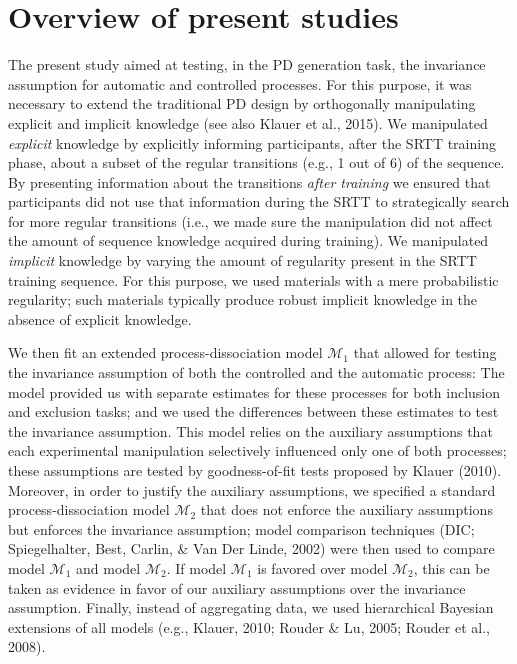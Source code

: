 \documentclass[floatsintext,man]{apa6}
\begin{document}
\section{Overview of present studies}\label{overview-of-present-studies}

The present study aimed at testing, in the PD generation task, the
invariance assumption for automatic and controlled processes. For this
purpose, it was necessary to extend the traditional PD design by
orthogonally manipulating explicit and implicit knowledge (see also
Klauer et al., 2015). We manipulated \emph{explicit} knowledge by
explicitly informing participants, after the SRTT training phase, about
a subset of the regular transitions (e.g., 1 out of 6) of the sequence.
By presenting information about the transitions \emph{after training} we
ensured that participants did not use that information during the SRTT
to strategically search for more regular transitions (i.e., we made sure
the manipulation did not affect the amount of sequence knowledge
acquired during training). We manipulated \emph{implicit} knowledge by
varying the amount of regularity present in the SRTT training sequence.
For this purpose, we used materials with a mere probabilistic
regularity; such materials typically produce robust implicit knowledge
in the absence of explicit knowledge.

We then fit an extended process-dissociation model \(\mathcal{M}_1\)
that allowed for testing the invariance assumption of both the
controlled and the automatic process: The model provided us with
separate estimates for these processes for both inclusion and exclusion
tasks; and we used the differences between these estimates to test the
invariance assumption. This model relies on the auxiliary assumptions
that each experimental manipulation selectively influenced only one of
both processes; these assumptions are tested by goodness-of-fit tests
proposed by Klauer (2010). Moreover, in order to justify the auxiliary
assumptions, we specified a standard process-dissociation model
\(\mathcal{M}_2\) that does not enforce the auxiliary assumptions but
enforces the invariance assumption; model comparison techniques (DIC;
Spiegelhalter, Best, Carlin, \& Van Der Linde, 2002) were then used to
compare model \(\mathcal{M}_1\) and model \(\mathcal{M}_2\). If model
\(\mathcal{M}_1\) is favored over model \(\mathcal{M}_2\), this can be
taken as evidence in favor of our auxiliary assumptions over the
invariance assumption. Finally, instead of aggregating data, we used
hierarchical Bayesian extensions of all models (e.g., Klauer, 2010;
Rouder \& Lu, 2005; Rouder et al., 2008).
\end{document}
